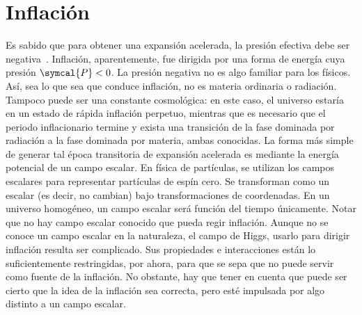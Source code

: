 \section{Inflación}
Es sabido que para obtener una expansión acelerada, la presión efectiva debe ser negativa~\cite{dodelson2020modern}. Inflación, aparentemente, fue dirigida por una forma de energía cuya presión \(\symcal{P}<0\). La presión negativa no es algo familiar para los físicos. Así, sea lo que sea que conduce inflación, no es materia ordinaria o radiación. Tampoco puede ser una constante cosmológica: en este caso, el universo estaría en un estado de rápida inflación perpetuo, mientras que es necesario que el periodo inflacionario termine y exista una transición de la fase dominada por radiación a la fase dominada por materia, ambas conocidas.
\newpage
La forma más simple de generar tal época transitoria de expansión acelerada es mediante la energía potencial de un campo escalar. En física de partículas, se utilizan los campos escalares para representar partículas de espín cero. Se transforman como un escalar (es decir, no cambian) bajo transformaciones de coordenadas. En un universo homogéneo, un campo escalar será función del tiempo únicamente. Notar que no hay campo escalar conocido que pueda regir inflación. Aunque no se conoce un campo escalar en la naturaleza, el campo de Higgs, usarlo para dirigir inflación resulta ser complicado. Sus propiedades e interacciones están lo suficientemente restringidas, por ahora, para que se sepa que no puede servir como fuente de la inflación. No obstante, hay que tener en cuenta que puede ser cierto que la idea de la inflación sea correcta, pero esté impulsada por algo distinto a un campo escalar.
